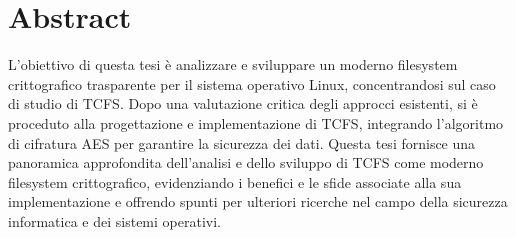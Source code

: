 \chapter*{Abstract}

L'obiettivo di questa tesi è analizzare e sviluppare un moderno filesystem crittografico trasparente per il sistema operativo Linux, concentrandosi sul caso di studio di TCFS. Dopo una  valutazione critica degli approcci esistenti, si è proceduto alla progettazione e implementazione di TCFS, integrando l'algoritmo di cifratura AES per garantire la sicurezza dei dati. Questa tesi fornisce una panoramica approfondita dell'analisi e dello sviluppo di TCFS come moderno filesystem crittografico, evidenziando i benefici e le sfide associate alla sua implementazione e offrendo spunti per ulteriori ricerche nel campo della sicurezza informatica e dei sistemi operativi.